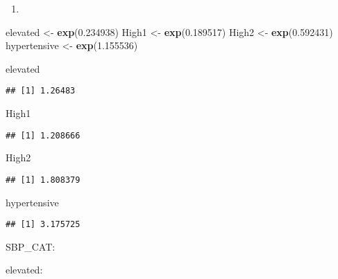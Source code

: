 \documentclass[]{article}
\newenvironment{Shaded}{\begin{snugshade}}{\end{snugshade}}
\newcommand{\FloatTok}[1]{\textcolor[rgb]{0.00,0.00,0.81}{#1}}
\newcommand{\KeywordTok}[1]{\textcolor[rgb]{0.13,0.29,0.53}{\textbf{#1}}}
\newcommand{\NormalTok}[1]{#1}
\newcommand{\StringTok}[1]{\textcolor[rgb]{0.31,0.60,0.02}{#1}}
\begin{document}
\begin{enumerate}
\def\labelenumi{\roman{enumi})}
\setcounter{enumi}{1}
\item
\end{enumerate}

\begin{Shaded}
\begin{Highlighting}[]
\NormalTok{elevated <-}\StringTok{ }\KeywordTok{exp}\NormalTok{(}\FloatTok{0.234938}\NormalTok{)}
\NormalTok{High1 <-}\StringTok{ }\KeywordTok{exp}\NormalTok{(}\FloatTok{0.189517}\NormalTok{)}
\NormalTok{High2 <-}\StringTok{ }\KeywordTok{exp}\NormalTok{(}\FloatTok{0.592431}\NormalTok{)}
\NormalTok{hypertensive <-}\StringTok{ }\KeywordTok{exp}\NormalTok{(}\FloatTok{1.155536}\NormalTok{)}

\NormalTok{elevated }
\end{Highlighting}
\end{Shaded}

\begin{verbatim}
## [1] 1.26483
\end{verbatim}

\begin{Shaded}
\begin{Highlighting}[]
\NormalTok{High1 }
\end{Highlighting}
\end{Shaded}

\begin{verbatim}
## [1] 1.208666
\end{verbatim}

\begin{Shaded}
\begin{Highlighting}[]
\NormalTok{High2 }
\end{Highlighting}
\end{Shaded}

\begin{verbatim}
## [1] 1.808379
\end{verbatim}

\begin{Shaded}
\begin{Highlighting}[]
\NormalTok{hypertensive}
\end{Highlighting}
\end{Shaded}

\begin{verbatim}
## [1] 3.175725
\end{verbatim}

SBP\_CAT:

elevated:
\end{document}
